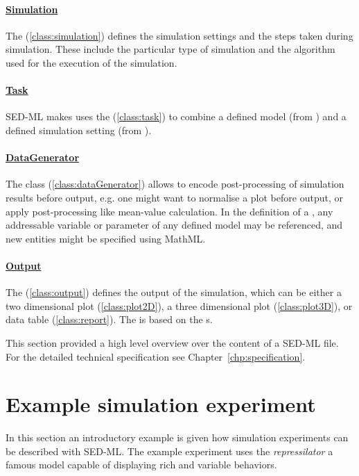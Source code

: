 \paragraph*{\hyperref[class:simulation]{Simulation}}
The  (\ref{class:simulation}) defines the simulation settings and the steps taken during simulation. These include the particular type of simulation and the algorithm used for the execution of the simulation.

\paragraph*{\hyperref[class:task]{Task}}
SED-ML makes uses the  (\ref{class:task}) to combine a defined model (from ) and a defined simulation setting (from ).

\paragraph*{\hyperref[class:dataGenerator]{DataGenerator}}
The  class (\ref{class:dataGenerator}) allows to encode post-processing of simulation results before output, e.g. one might want to normalise a plot before output, or apply post-processing like mean-value calculation. In the definition of a , any addressable variable or parameter of any defined model may be referenced, and new entities might be specified using MathML.

\paragraph*{\hyperref[class:output]{Output}}
The  (\ref{class:output}) defines the output of the simulation, which can be either a two dimensional plot  (\ref{class:plot2D}), a three dimensional plot  (\ref{class:plot3D}), or data table  (\ref{class:report}). The  is based on the s.

This section provided a high level overview over the content of a SED-ML file. For the detailed technical specification see Chapter~\ref{chp:specification}. 

\section{Example simulation experiment}
\label{motivation:example}
In this section an introductory example is given how simulation experiments can be described with SED-ML. The example experiment uses the \emph{repressilator} \citep{Elowitz:2000} a famous model capable of displaying rich and variable behaviors.

